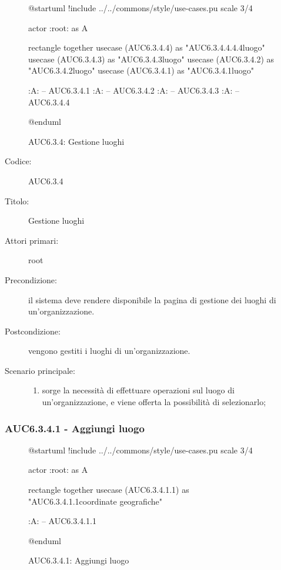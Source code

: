 \documentclass[casi-duso]{subfiles}
\begin{document}
\begin{figure}[h!]
  \centering
  \begin{plantuml}
  @startuml
  !include ../../commons/style/use-cases.pu
  scale 3/4

  actor :root: as A

  rectangle {
    together {
      usecase (AUC6.3.4.4) as "AUC6.3.4.4.4.4\nSeleziona luogo"
      usecase (AUC6.3.4.3) as "AUC6.3.4.3\nModifica luogo"
      usecase (AUC6.3.4.2) as "AUC6.3.4.2\nEliminazione luogo"
      usecase (AUC6.3.4.1) as "AUC6.3.4.1\nAggiungi luogo"
    }
  }

  :A: -- AUC6.3.4.1
  :A: -- AUC6.3.4.2
  :A: -- AUC6.3.4.3
  :A: -- AUC6.3.4.4

  @enduml
  \end{plantuml}
  \caption{AUC6.3.4: Gestione luoghi}
  \label{fig:auc6_3_4}
\end{figure}

\begin{description}
  \item[Codice:] AUC6.3.4
  \item[Titolo:] Gestione luoghi
  \item[Attori primari:] root
  \item[Precondizione:] il sistema deve rendere disponibile la pagina di gestione dei luoghi di un'organizzazione.
  \item[Postcondizione:] vengono gestiti i luoghi di un'organizzazione.
  \item[Scenario principale:]
  \begin{enumerate}
    \item sorge la necessità di effettuare operazioni sul luogo di un'organizzazione, e viene offerta la possibilità di selezionarlo;
  \end{enumerate}
\end{description}

\subsubsection{AUC6.3.4.1 - Aggiungi luogo}%
\label{subsub:AUC6.3.4.1}

\begin{figure}[h!]
  \centering
  \begin{plantuml}
  @startuml
  !include ../../commons/style/use-cases.pu
  scale 3/4

  actor :root: as A

  rectangle {
    together {
      usecase (AUC6.3.4.1.1) as "AUC6.3.4.1.1\nInserisci coordinate geografiche"
    }
  }

  :A: -- AUC6.3.4.1.1

  @enduml
  \end{plantuml}
  \caption{AUC6.3.4.1: Aggiungi luogo}
  \label{fig:auc6_3_4_1}
\end{figure}
\end{document}
